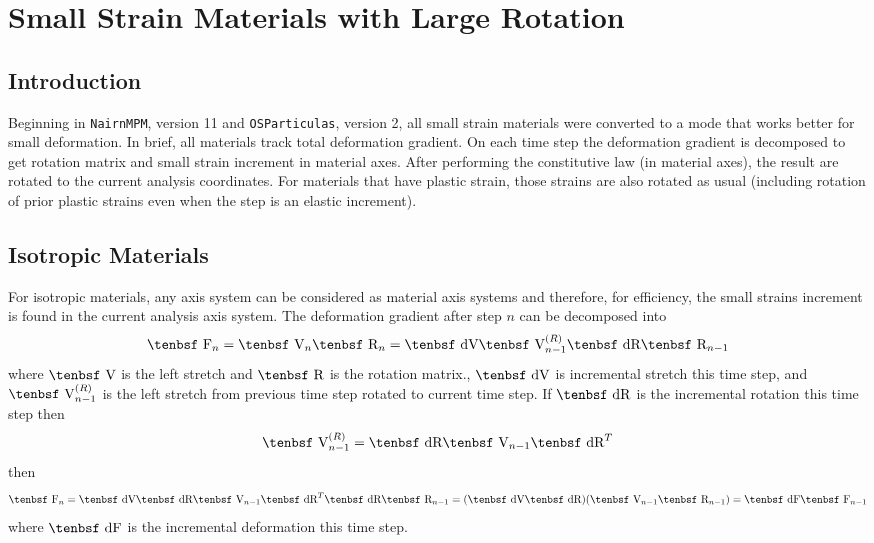 \documentclass[11pt]{book}
\def\F{\hbox{\tenbsf F}}
\def\dF{\hbox{\tenbsf dF}}
\def\R{\hbox{\tenbsf R}}
\def\dR{\hbox{\tenbsf dR}}
\def\V{\hbox{\tenbsf V}}
\def\dV{\hbox{\tenbsf dV}}
\begin{document}
\chapter{Small Strain Materials with Large Rotation}

\section{Introduction}

Beginning in {\tt NairnMPM}, version 11 and {\tt OSParticulas}, version 2, all small strain materials were converted to a mode that works better for small deformation. In brief, all materials track total deformation gradient. On each time step the deformation gradient is decomposed to get rotation matrix and small strain increment in material axes. After performing the constitutive law (in material axes), the result are rotated to the current analysis coordinates. For materials that have plastic strain, those strains are also rotated as usual (including rotation of prior plastic strains even when the step is an elastic increment).

\section{Isotropic Materials}

For isotropic materials, any axis system can be considered as material axis systems and therefore, for efficiency, the small strains increment is found in the current analysis axis system. The deformation gradient after step $n$ can be decomposed into
\begin{equation}
   \F_n = \V_n\R_n = \dV \V_{n-1}^{(R)} \dR \R_{n-1}
\end{equation}
where $\V$ is the left stretch and $\R$ is the rotation matrix., $\dV$ is incremental stretch this time step, and $\V_{n-1}^{(R)} $ is the left stretch from previous time step rotated to current time step. If $\dR$ is the incremental rotation this time step then
\begin{equation}
    \V_{n-1}^{(R)} =  \dR \V_{n-1} \dR^T
\end{equation}
then
\begin{equation}
   \F_n =  \dV \dR \V_{n-1} \dR^T \dR \R_{n-1} = (\dV\dR)(\V_{n-1}  \R_{n-1}) = \dF \F_{n-1}
\end{equation}
where $\dF$ is the incremental deformation this time step.
\end{document}
